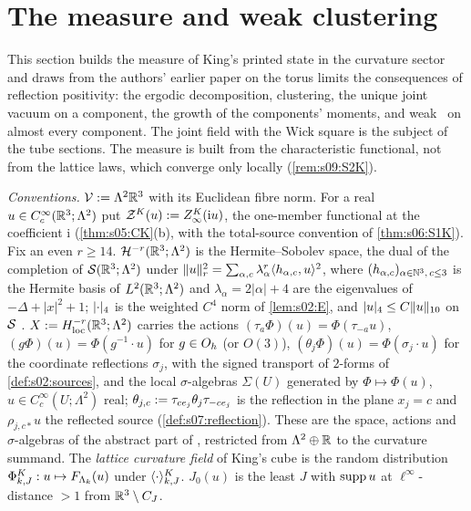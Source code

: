 \section{The measure and weak clustering}

This section builds the measure of King's printed state in the curvature sector and draws from the authors' earlier paper on the torus limits \cite{SymPhase} the consequences of reflection positivity: the ergodic decomposition, clustering, the unique joint vacuum on a component, the growth of the components' moments, and weak \OSf\ on almost every component. The joint field with the Wick square is the subject of the tube sections. The measure is built from the characteristic functional, not from the lattice laws, which converge only locally (\cref{rem:s09:S2K}).

\emph{Conventions.} $\mathcal V:=\Lambda^2\mathbb R^3$ with its Euclidean fibre norm. For a real $u\in C^\infty_c(\mathbb R^3;\Lambda^2)$ put $\mathcal Z^K(u):=Z^{K}_{\infty}(\mathrm iu)$, the one-member functional at the coefficient $\mathrm i$ (\cref{thm:s05:CK}(b), with the total-source convention of \cref{thm:s06:S1K}). Fix an even $r\ge14$. $\mathcal H^{-r}(\mathbb R^3;\Lambda^2)$ is the Hermite--Sobolev space, the dual of the completion of $\mathcal S(\mathbb R^3;\Lambda^2)$ under $\lVert u\rVert_r^2=\sum_{\alpha,c}\lambda_\alpha^{r}\langle h_{\alpha,c},u\rangle^2$, where $(h_{\alpha,c})_{\alpha\in\mathbb N^3,\,c\le3}$ is the Hermite basis of $L^2(\mathbb R^3;\Lambda^2)$ and $\lambda_\alpha=2|\alpha|+4$ are the eigenvalues of $-\Delta+|x|^2+1$; $\lvert \cdot\rvert_{4}$ is the weighted $C^4$ norm of \cref{lem:s02:E}, and $\lvert u\rvert_{4}\le C\lVert u\rVert_{10}$ on $\mathcal S$ \cite[Lemma~10.5(a)]{SymPhase}. $X:= H^{-r}_{\mathrm{loc}}(\mathbb R^3;\Lambda^2)$ carries the actions $(\tau_a\Phi)(u)=\Phi(\tau_{-a}u)$, $(g\Phi)(u)=\Phi(g^{-1}\cdot u)$ for $g\in O_h$ (or $O(3)$), $(\theta_j\Phi)(u)=\Phi(\sigma_j\cdot u)$ for the coordinate reflections $\sigma_j$, with the signed transport of $2$-forms of \cref{def:s02:sources}, and the local $\sigma$-algebras $\Sigma(U)$ generated by $\Phi\mapsto\Phi(u)$, $u\in C^\infty_c(U;\Lambda^2)$ real; $\theta_{j,c}:=\tau_{ce_j}\theta_j\tau_{-ce_j}$ is the reflection in the plane $x_j=c$ and $\rho_{j,c*}u$ the reflected source (\cref{def:s07:reflection}). These are the space, actions and $\sigma$-algebras of the abstract part of \cite{SymPhase}, restricted from $\Lambda^2\oplus\mathbb R$ to the curvature summand. The \emph{lattice curvature field} of King's cube is the random distribution $\Phi^K_{k,J}:u\mapsto F_{\Lambda_k}(u)$ under $\langle \cdot\rangle^{K}_{k,J}$. $J_0(u)$ is the least $J$ with $\operatorname{supp} u$ at $\ell^\infty$-distance $>1$ from $\mathbb R^3\setminus C_J$.

